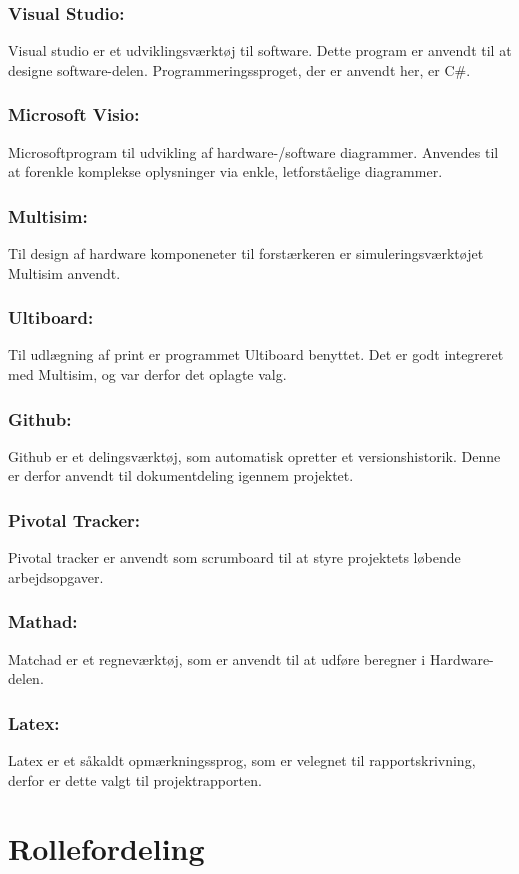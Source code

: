 \subsubsection{Visual Studio:}
Visual studio er et udviklingsværktøj til software. Dette program er anvendt til at designe software-delen. Programmeringssproget, der er anvendt her, er C$\#$. 
\subsubsection{Microsoft Visio:}
Microsoftprogram til udvikling af hardware-/software diagrammer. Anvendes til at forenkle komplekse oplysninger via enkle, letforståelige diagrammer.
\subsubsection{Multisim:}
Til design af hardware komponeneter til forstærkeren er simuleringsværktøjet Multisim anvendt. 
\subsubsection{Ultiboard:}
Til udlægning af print er programmet Ultiboard benyttet. Det er godt integreret med Multisim, og var derfor det oplagte valg.
\subsubsection{Github:}
Github er et delingsværktøj, som automatisk opretter et versionshistorik. Denne er derfor anvendt til dokumentdeling igennem projektet. 
\subsubsection{Pivotal Tracker:}
Pivotal tracker er anvendt som scrumboard til at styre projektets løbende arbejdsopgaver. 
\subsubsection{Mathad:}
Matchad er et regneværktøj, som er anvendt til at udføre beregner i Hardware-delen. 
\subsubsection{Latex:}
Latex er et såkaldt opmærkningssprog, som er velegnet til rapportskrivning, derfor er dette valgt til projektrapporten. 

\section{Rollefordeling}

